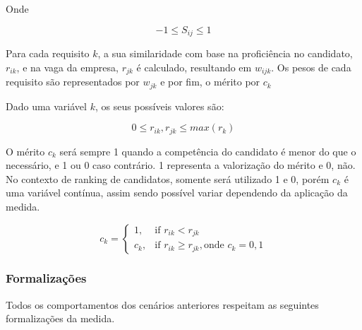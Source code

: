 \documentclass[preprint,12pt]{elsarticle}
\begin{document}
Onde

\begin{equation}
-1 \leq S_{ij} \leq 1
\end{equation}

Para cada requisito $k$, a sua similaridade com base na proficiência no candidato, $r_{ik}$, e na vaga da empresa, $r_{jk}$ é calculado, resultando em $w_{ijk}$. Os pesos de cada requisito são representados por $w_{jk}$ e por fim, o mérito por $c_k$


Dado uma variável $k$, os seus possíveis valores são:

\begin{equation}
0 \leq r_{ik}, r_{jk} \leq max(r_k)
\end{equation}

O mérito $c_{k}$ será sempre 1 quando a competência do candidato é menor do que o necessário, e 1 ou 0 caso contrário. 1 representa a valorização do mérito e 0, não. No contexto de ranking de candidatos, somente será utilizado 1 e 0, porém $c_{k}$ é uma variável contínua, assim sendo possível variar dependendo da aplicação da medida.

\begin{equation}
c_{k} = \begin{cases} 1, & \text{if } r_{ik} < r_{jk} \\ c_{k}, & \text{if } r_{ik} \geq r_{jk}, \text{onde } c_k = 0, 1 \end{cases}
\end{equation}

\subsubsection{Formalizações}

Todos os comportamentos dos cenários anteriores respeitam as seguintes formalizações da medida.
\end{document}
